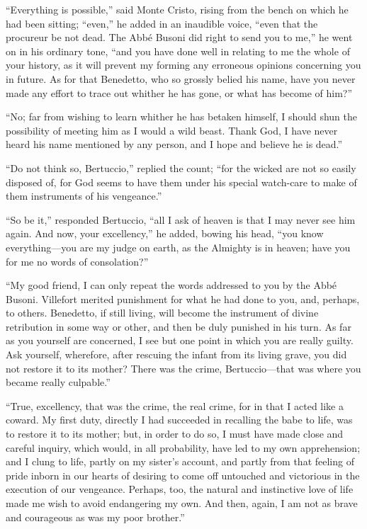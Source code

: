 “Everything is possible,” said Monte Cristo, rising from the bench on
which he had been sitting; “even,” he added in an inaudible voice,
“even that the procureur be not dead. The Abbé Busoni did right to send
you to me,” he went on in his ordinary tone, “and you have done well in
relating to me the whole of your history, as it will prevent my forming
any erroneous opinions concerning you in future. As for that Benedetto,
who so grossly belied his name, have you never made any effort to trace
out whither he has gone, or what has become of him?”

“No; far from wishing to learn whither he has betaken himself, I should
shun the possibility of meeting him as I would a wild beast. Thank God,
I have never heard his name mentioned by any person, and I hope and
believe he is dead.”

“Do not think so, Bertuccio,” replied the count; “for the wicked are
not so easily disposed of, for God seems to have them under his special
watch-care to make of them instruments of his vengeance.”

“So be it,” responded Bertuccio, “all I ask of heaven is that I may
never see him again. And now, your excellency,” he added, bowing his
head, “you know everything—you are my judge on earth, as the Almighty
is in heaven; have you for me no words of consolation?”

“My good friend, I can only repeat the words addressed to you by the
Abbé Busoni. Villefort merited punishment for what he had done to you,
and, perhaps, to others. Benedetto, if still living, will become the
instrument of divine retribution in some way or other, and then be duly
punished in his turn. As far as you yourself are concerned, I see but
one point in which you are really guilty. Ask yourself, wherefore,
after rescuing the infant from its living grave, you did not restore it
to its mother? There was the crime, Bertuccio—that was where you became
really culpable.”

“True, excellency, that was the crime, the real crime, for in that I
acted like a coward. My first duty, directly I had succeeded in
recalling the babe to life, was to restore it to its mother; but, in
order to do so, I must have made close and careful inquiry, which
would, in all probability, have led to my own apprehension; and I clung
to life, partly on my sister’s account, and partly from that feeling of
pride inborn in our hearts of desiring to come off untouched and
victorious in the execution of our vengeance. Perhaps, too, the natural
and instinctive love of life made me wish to avoid endangering my own.
And then, again, I am not as brave and courageous as was my poor
brother.”

